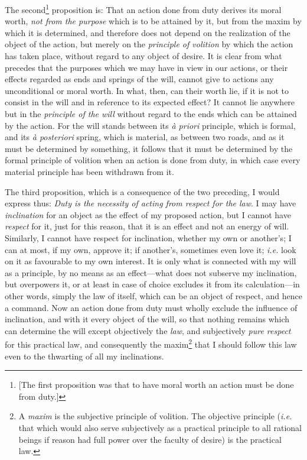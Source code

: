 The second\footnote{[The first proposition was that to have moral
worth an action must be done from duty.]} proposition is: That an
action done from duty derives its moral worth, \textit{not from the
purpose} which is to be attained by it, but from the maxim by which it
is determined, and therefore does not depend on the realization of the
object of the action, but merely on the \textit{principle of volition}
by which the action has taken place, without regard to any object of
desire. It is clear from what precedes that the purposes which we may
have in view in our actions, or their effects regarded as ends and
springs of the will, cannot give to actions any unconditional or moral
worth. In what, then, can their worth lie, if it is not to consist in
the will and in reference to its expected effect? It cannot lie
anywhere but in the \textit{principle of the will} without regard to
the ends which can be attained by the action. For the will stands
between its \textit{\`a priori} principle, which is formal, and its
\textit{\`a posteriori} spring, which is material, as between two
roads, and as it must be determined by something, it follows that it
must be determined by the formal principle of volition when an action
is done from duty, in which case every material principle has been
withdrawn from it.

The third proposition, which is a consequence of the two preceding, I
would express thus: \textit{Duty is the necessity of acting from
respect for the law}. I may have \textit{inclination} for an object as
the effect of my proposed action, but I cannot have \textit{respect}
for it, just for this reason, that it is an effect and not an energy
of will. Similarly, I cannot have respect for inclination, whether my
own or another's; I can at most, if my own, approve it; if another's,
sometimes even love it; \textit{i.e.} look on it as favourable to my
own interest. It is only what is connected with my will as a
principle, by no means as an effect---what does not subserve my
inclination, but overpowers it, or at least in case of choice excludes
it from its calculation---in other words, simply the law  of
itself, which can be an object of respect, and hence a command. Now an
action done from duty must wholly exclude the influence of
inclination, and with it every object of the will, so that nothing
remains which can determine the will except objectively the
\textit{law}, and subjectively \textit{pure respect} for this
practical law, and consequently the maxim\footnote{A \textit{maxim} is
the subjective principle of volition. The objective principle
(\textit{i.e.} that which would also serve subjectively as a practical
principle to all rational beings if reason had full power over the
faculty of desire) is the practical law.} that I should follow this
law even to the thwarting of all my inclinations.


